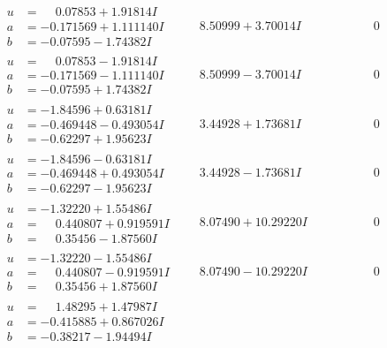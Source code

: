 \documentclass[1p]{elsarticle_modified}
\theoremstyle{definition}
\begin{document}
$$\begin{array}{c|c|c}
\begin{aligned}
u &= \phantom{-}0.07853 + 1.91814 I \\
a &= -0.171569 + 1.111140 I \\
b &= -0.07595 - 1.74382 I\end{aligned}
 & \phantom{-}8.50999 + 3.70014 I & \phantom{-0.000000 } 0 \\ \hline\begin{aligned}
u &= \phantom{-}0.07853 - 1.91814 I \\
a &= -0.171569 - 1.111140 I \\
b &= -0.07595 + 1.74382 I\end{aligned}
 & \phantom{-}8.50999 - 3.70014 I & \phantom{-0.000000 } 0 \\ \hline\begin{aligned}
u &= -1.84596 + 0.63181 I \\
a &= -0.469448 - 0.493054 I \\
b &= -0.62297 + 1.95623 I\end{aligned}
 & \phantom{-}3.44928 + 1.73681 I & \phantom{-0.000000 } 0 \\ \hline\begin{aligned}
u &= -1.84596 - 0.63181 I \\
a &= -0.469448 + 0.493054 I \\
b &= -0.62297 - 1.95623 I\end{aligned}
 & \phantom{-}3.44928 - 1.73681 I & \phantom{-0.000000 } 0 \\ \hline\begin{aligned}
u &= -1.32220 + 1.55486 I \\
a &= \phantom{-}0.440807 + 0.919591 I \\
b &= \phantom{-}0.35456 - 1.87560 I\end{aligned}
 & \phantom{-}8.07490 + 10.29220 I & \phantom{-0.000000 } 0 \\ \hline\begin{aligned}
u &= -1.32220 - 1.55486 I \\
a &= \phantom{-}0.440807 - 0.919591 I \\
b &= \phantom{-}0.35456 + 1.87560 I\end{aligned}
 & \phantom{-}8.07490 - 10.29220 I & \phantom{-0.000000 } 0 \\ \hline\begin{aligned}
u &= \phantom{-}1.48295 + 1.47987 I \\
a &= -0.415885 + 0.867026 I \\
b &= -0.38217 - 1.94494 I\end{aligned}

\end{array}$$
\end{document}
